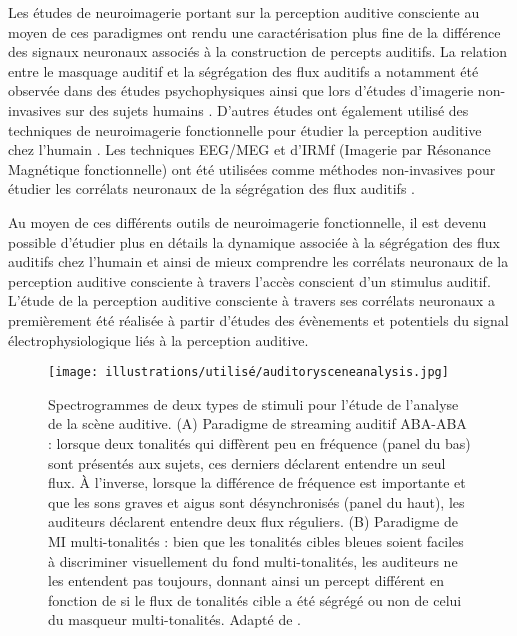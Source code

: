 Les études de neuroimagerie portant sur la perception auditive consciente au moyen de ces paradigmes ont rendu une caractérisation plus fine de la différence des signaux neuronaux associés à la construction de percepts auditifs.
La relation entre le masquage auditif et la ségrégation des flux auditifs a notamment été observée dans des études psychophysiques ainsi que lors d'études d'imagerie non-invasives sur des sujets humains \citep{sussman2001auditory, winkler2003newborn, micheyl2007hearing, sheft2008method, snyder2012attention}. 
D'autres études ont également utilisé des techniques de neuroimagerie fonctionnelle pour étudier la perception auditive chez l'humain \citep{cusack2005intraparietal, deike2004auditory, deike2010active, gutschalk2005neuromagnetic, gutschalk2007human, kondo2009involvement, schadwinkel2010activity, schadwinkel2011transient, snyder2006effects, snyder2007sequential, sussman1999investigation, wilson2007cortical}. 
Les techniques EEG/MEG et d'IRMf (Imagerie par Résonance Magnétique fonctionnelle) ont été utilisées comme méthodes non-invasives pour étudier les corrélats neuronaux de la ségrégation des flux auditifs \citep{akram2015neural, denham2006role, micheyl2007hearing, melcher2009auditory, gutschalk2014functional}. 

Au moyen de ces différents outils de neuroimagerie fonctionnelle, il est devenu possible d'étudier plus en détails la dynamique associée à la ségrégation des flux auditifs chez l'humain et ainsi de mieux comprendre les corrélats neuronaux de la perception auditive consciente à travers l'accès conscient d'un stimulus auditif. 
L'étude de la perception auditive consciente à travers ses corrélats neuronaux a premièrement été réalisée à partir d'études des évènements et potentiels du signal électrophysiologique liés à la perception auditive. 

\begin{figure*}[!t]
\center
\texttt{[image: illustrations/utilisé/auditorysceneanalysis.jpg]}
\caption[Spectrogrammes de deux types de stimuli utilisés pour étudier l'analyse de la scène auditive]{Spectrogrammes de deux types de stimuli pour l'étude de l'analyse de la scène auditive. (A) Paradigme de streaming auditif ABA-ABA : lorsque deux tonalités qui diffèrent peu en fréquence (panel du bas) sont présentés aux sujets, ces derniers déclarent entendre un seul flux. À l'inverse, lorsque la différence de fréquence est importante et que les sons graves et aigus sont désynchronisés (panel du haut), les auditeurs déclarent entendre deux flux réguliers. (B) Paradigme de MI multi-tonalités : bien que les tonalités cibles bleues soient faciles à discriminer visuellement du fond multi-tonalités, les auditeurs ne les entendent pas toujours, donnant ainsi un percept différent en fonction de si le flux de tonalités cible a été ségrégé ou non de celui du masqueur multi-tonalités. Adapté de \cite{dykstra2013psychophysics}.} 
\label{fig:chap2paradigmestreamingauditif}
\end{figure*}


